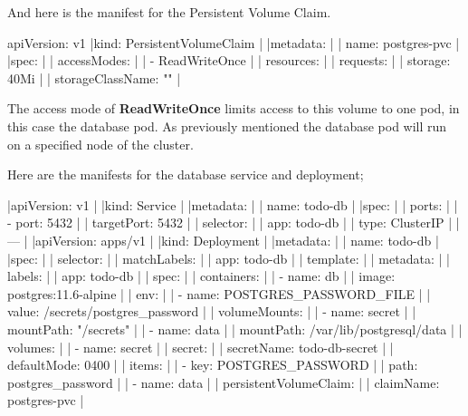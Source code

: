 \noindent And here is the manifest for the Persistent Volume Claim.

\ms

\beginlines apiVersion: v1
|kind: PersistentVolumeClaim  |
|metadata:                    |
|  name: postgres-pvc         |
|spec:                        |
|  accessModes:               |
|    - ReadWriteOnce          |
|  resources:                 |
|    requests:                |
|      storage: 40Mi          |
|  storageClassName: ""       |
\endlines

\ms

The access mode of {\bf ReadWriteOnce} limits access to this volume to one pod, in this case the database pod.
As previously mentioned the database  pod will run on a specified node of the cluster.

\noindent
Here are the manifests for the database service and deployment;

\beginlines
|apiVersion: v1                              |
|kind: Service                               |
|metadata:                                   |
|  name: todo-db                             |
|spec:                                       |
|  ports:                                    |
|    - port: 5432                            |
|      targetPort: 5432                      |
|  selector:                                 |
|    app: todo-db                            |
|  type: ClusterIP                           |
|---                                         |
|apiVersion: apps/v1                        |
|kind: Deployment                           |
|metadata:                                  |
|  name: todo-db                            |
|spec:                                      |
|  selector:                                |
|    matchLabels:                           |
|      app: todo-db                         |
|  template:                                |
|    metadata:                              |
|      labels:                              |
|        app: todo-db                       |
|    spec:                                  |
|      containers:                          |
|        - name: db                         |
|          image: postgres:11.6-alpine      |
|          env:                             |
|          - name: POSTGRES_PASSWORD_FILE   |
|            value: /secrets/postgres_password |
|          volumeMounts:                    |
|            - name: secret                 |
|              mountPath: "/secrets"        |
|            - name: data                   |
|              mountPath: /var/lib/postgresql/data |
|      volumes:                             |
|        - name: secret                     |
|          secret:                          |
|            secretName: todo-db-secret     |
|            defaultMode: 0400              |
|            items:                         |
|            - key: POSTGRES_PASSWORD       |
|              path: postgres_password      |
|        - name: data                       |
|          persistentVolumeClaim:           |
|            claimName: postgres-pvc        |
\endlines


